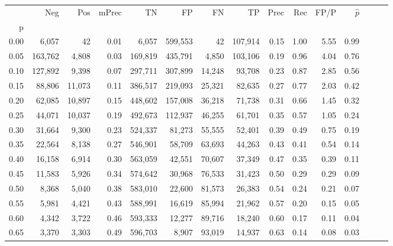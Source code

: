 \begin{tabular}{rrrrrrrrrrrrrrr}
\toprule
{} &      Neg &     Pos & mPrec &       TN &       FP &       FN &       TP &  Prec &   Rec &  FP/P & $\hat{p}$ \\
p    &          &         &       &          &          &          &          &       &       &       &           \\
\midrule
0.00 &    6,057 &      42 &  0.01 &    6,057 &  599,553 &       42 &  107,914 &  0.15 &  1.00 &  5.55 &      0.99 \\
0.05 &  163,762 &   4,808 &  0.03 &  169,819 &  435,791 &    4,850 &  103,106 &  0.19 &  0.96 &  4.04 &      0.76 \\
0.10 &  127,892 &   9,398 &  0.07 &  297,711 &  307,899 &   14,248 &   93,708 &  0.23 &  0.87 &  2.85 &      0.56 \\
0.15 &   88,806 &  11,073 &  0.11 &  386,517 &  219,093 &   25,321 &   82,635 &  0.27 &  0.77 &  2.03 &      0.42 \\
0.20 &   62,085 &  10,897 &  0.15 &  448,602 &  157,008 &   36,218 &   71,738 &  0.31 &  0.66 &  1.45 &      0.32 \\
0.25 &   44,071 &  10,037 &  0.19 &  492,673 &  112,937 &   46,255 &   61,701 &  0.35 &  0.57 &  1.05 &      0.24 \\
0.30 &   31,664 &   9,300 &  0.23 &  524,337 &   81,273 &   55,555 &   52,401 &  0.39 &  0.49 &  0.75 &      0.19 \\
0.35 &   22,564 &   8,138 &  0.27 &  546,901 &   58,709 &   63,693 &   44,263 &  0.43 &  0.41 &  0.54 &      0.14 \\
0.40 &   16,158 &   6,914 &  0.30 &  563,059 &   42,551 &   70,607 &   37,349 &  0.47 &  0.35 &  0.39 &      0.11 \\
0.45 &   11,583 &   5,926 &  0.34 &  574,642 &   30,968 &   76,533 &   31,423 &  0.50 &  0.29 &  0.29 &      0.09 \\
0.50 &    8,368 &   5,040 &  0.38 &  583,010 &   22,600 &   81,573 &   26,383 &  0.54 &  0.24 &  0.21 &      0.07 \\
0.55 &    5,981 &   4,421 &  0.43 &  588,991 &   16,619 &   85,994 &   21,962 &  0.57 &  0.20 &  0.15 &      0.05 \\
0.60 &    4,342 &   3,722 &  0.46 &  593,333 &   12,277 &   89,716 &   18,240 &  0.60 &  0.17 &  0.11 &      0.04 \\
0.65 &    3,370 &   3,303 &  0.49 &  596,703 &    8,907 &   93,019 &   14,937 &  0.63 &  0.14 &  0.08 &      0.03 \\

\end{tabular}

